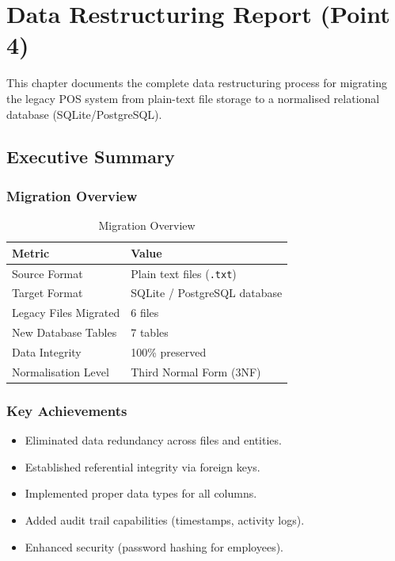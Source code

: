 \chapter{Data Restructuring Report (Point 4)}

This chapter documents the complete data restructuring process for
migrating the legacy POS system from plain-text file storage to a
normalised relational database (SQLite/PostgreSQL).

\section{Executive Summary}

\subsection*{Migration Overview}

\begin{table}[h]
  \centering
  \caption{Migration Overview}
  \begin{tabular}{p{5cm} p{6cm}}
    \toprule
    \textbf{Metric} & \textbf{Value} \\
    \midrule
    Source Format        & Plain text files (\texttt{.txt}) \\
    Target Format        & SQLite / PostgreSQL database \\
    Legacy Files Migrated & 6 files \\
    New Database Tables  & 7 tables \\
    Data Integrity       & 100\% preserved \\
    Normalisation Level  & Third Normal Form (3NF) \\
    \bottomrule
  \end{tabular}
\end{table}

\subsection*{Key Achievements}

\begin{itemize}[leftmargin=1.2cm]
  \item Eliminated data redundancy across files and entities.
  \item Established referential integrity via foreign keys.
  \item Implemented proper data types for all columns.
  \item Added audit trail capabilities (timestamps, activity logs).
  \item Enhanced security (password hashing for employees).
\end{itemize}


